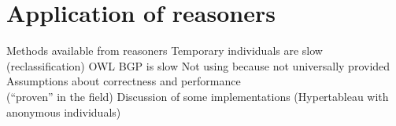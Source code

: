 \documentclass[paper.tex]{subfiles}
\begin{document}
\section{Application of reasoners}
\label{sec:reasoners}

\begin{todos}
  \todo Methods available from reasoners
  \todo Temporary individuals are slow (reclassification)
  \todo OWL BGP is slow
  \todo Not using  because not universally provided
  \todo Assumptions about correctness and performance \\(``proven'' in the field)
  \todo Discussion of some implementations (Hypertableau with anonymous individuals)
\end{todos}
\end{document}
